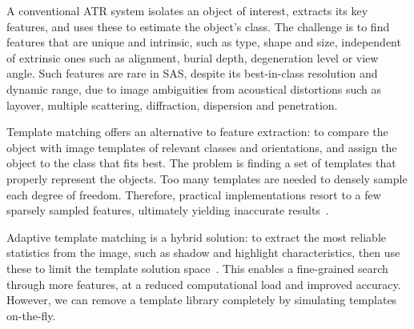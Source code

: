  

A conventional ATR system isolates an object of interest, extracts its key features, and uses these to estimate the object's class. The challenge is to find features that are unique and intrinsic, such as type, shape and size, independent of extrinsic ones such as alignment, burial depth, degeneration level or view angle. Such features are rare in SAS, despite its best-in-class resolution and dynamic range, due to image ambiguities from acoustical distortions such as layover, multiple scattering, diffraction, dispersion and penetration.


Template matching offers an alternative to feature extraction: to compare the object with image templates of relevant classes and orientations, and assign the object to the class that fits best. The problem is finding a set of templates that properly represent the objects. Too many templates are needed to densely sample each degree of freedom. Therefore, practical implementations resort to a few sparsely sampled features, ultimately yielding inaccurate results~\cite{Midelfart2010}.


Adaptive template matching is a hybrid solution: to extract the most reliable statistics from the image, such as shadow and highlight characteristics, then use these to limit the template solution space~\cite{Midelfart2010}. This enables a fine-grained search through more features, at a reduced computational load and improved accuracy. However, we can remove a template library completely by simulating templates on-the-fly.



